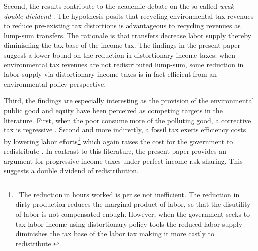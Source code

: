 Second, the results contribute to the academic debate on the so-called \textit{weak double-dividend} \citep[for example:][]{LansBovenberg1994EnvironmentalTaxation, LansBovenberg1996OptimalAnalyses}. The hypothesis posits that recycling environmental tax revenues to reduce pre-existing tax distortions is advantageous to recycling  revenues as lump-sum transfers. The rationale is that transfers decrease labor supply thereby diminishing the tax base of the income tax. %
The findings in the present paper suggest a lower bound on the reduction in distortionary income taxes: when environmental tax revenues are not redistributed lump-sum, some reduction in labor supply via distortionary income taxes is in fact efficient from an environmental policy perspective. %

Third, the findings are especially interesting as the provision of the environmental public good and equity have been perceived as competing targets in the literature. First, when the poor consume more of the polluting good, a corrective tax is regressive \citep{Sager2019IncomeCurves, Fried2018TheGenerations}. %
Second and more indirectly, a fossil tax exerts efficiency costs by lowering labor efforts\footnote{\ The reduction in hours worked is per se not inefficient. The reduction in dirty production reduces the marginal product of labor, so that the disutility of labor is not compensated enough. However, when the government seeks to tax labor income using distortionary policy tools the reduced labor supply diminishes the tax base of the labor tax making it more costly to redistribute.} which again raises the cost for the government to redistribute \citep{Dobkowitz2022}. 
In contrast to this literature, the present paper provides an argument for progressive income taxes under perfect income-risk sharing. This suggests a double dividend of redistribution. %
